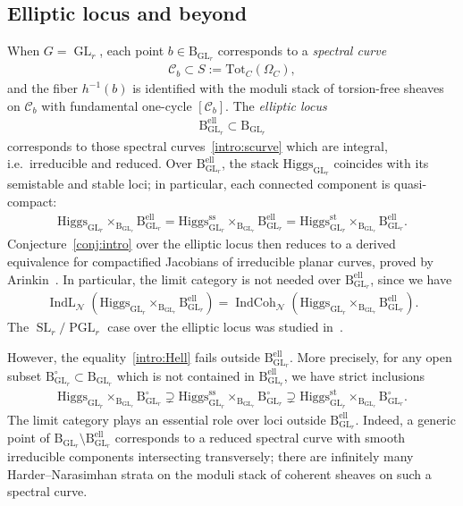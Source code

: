 \documentclass[11pt,oneside,a4paper,mathscr]{amsart}
\theoremstyle{definition}
\newcommand{\cC}{\mathcal{C}}
\newcommand{\rB}{\mathrm{B}}
\newcommand{\IndCoh}{\operatorname{IndCoh}}
\newcommand{\IndL}{\operatorname{IndL}}
\newcommand{\GL}{\operatorname{GL}}
\newcommand{\SL}{\operatorname{SL}}
\newcommand{\PGL}{\operatorname{PGL}}
\newcommand{\Hig}{\mathrm{Higgs}}
\begin{document}
\subsection{Elliptic locus and beyond}\label{subsec:introell}
When $G=\GL_r$, each point $b\in \rB_{\GL_r}$ corresponds to a 
\textit{spectral curve}
\begin{align}\label{intro:scurve}
    \cC_b \subset S:=\mathrm{Tot}_C(\Omega_C),
\end{align}
and the fiber $h^{-1}(b)$ is identified with the moduli stack of torsion-free sheaves on $\cC_b$ with fundamental one-cycle $[\cC_b]$. 
The \textit{elliptic locus} 
\begin{align*}
    \rB_{\GL_r}^{\mathrm{ell}} \subset \rB_{\GL_r}
\end{align*}
corresponds to those spectral curves~\eqref{intro:scurve} which are integral, i.e.\ irreducible and reduced. 
Over $\rB_{\GL_r}^{\mathrm{ell}}$, the stack $\Hig_{\GL_r}$ coincides with its semistable and stable loci; in particular, each connected component is quasi-compact:
\begin{align}\label{intro:Hell}
    \Hig_{\GL_r}\times_{\rB_{\GL_r}}\rB_{\GL_r}^{\mathrm{ell}}=
     \Hig_{\GL_r}^{\mathrm{ss}}\times_{\rB_{\GL_r}}\rB_{\GL_r}^{\mathrm{ell}}=
      \Hig_{\GL_r}^{\mathrm{st}}\times_{\rB_{\GL_r}}\rB_{\GL_r}^{\mathrm{ell}}.
\end{align}
Conjecture~\ref{conj:intro} over the elliptic locus then reduces to 
a derived equivalence for compactified Jacobians of irreducible 
planar curves, proved by Arinkin~\cite{Ardual}. In particular, the 
limit category is not needed over $\rB_{\GL_r}^{\mathrm{ell}}$, since 
we have 
\begin{align*}
    \IndL_{\mathcal{N}}(\Hig_{\GL_r}\times _{\rB_{\GL_r}}\rB_{\GL_r}^{\mathrm{ell}})
    =
    \IndCoh_{\mathcal{N}}(\Hig_{\GL_r}\times _{\rB_{\GL_r}}\rB_{\GL_r}^{\mathrm{ell}}).
\end{align*}
The $\SL_r/\PGL_r$ case over the elliptic locus was studied in~\cite[Theorem~4.7]{GS}.

However, the equality~\eqref{intro:Hell} fails outside $\rB_{\GL_r}^{\mathrm{ell}}$. 
More precisely, for any open subset $\rB_{\GL_r}^{\circ}\subset \rB_{\GL_r}$ which is not contained in 
$\rB_{\GL_r}^{\mathrm{ell}}$, we have strict inclusions
 \begin{align*}
       \Hig_{\GL_r}\times_{\rB_{\GL_r}}\rB_{\GL_r}^{\circ} \supsetneq
     \Hig_{\GL_r}^{\mathrm{ss}}\times_{\rB_{\GL_r}}\rB_{\GL_r}^{\circ} \supsetneq
      \Hig_{\GL_r}^{\mathrm{st}}\times_{\rB_{\GL_r}}\rB_{\GL_r}^{\circ}.
 \end{align*}
The limit category plays an essential role over loci outside $\rB_{\GL_r}^{\mathrm{ell}}$. 
Indeed, a generic point of $\rB_{\GL_r} \setminus \rB_{\GL_r}^{\mathrm{ell}}$ 
corresponds to a reduced spectral curve with smooth irreducible components intersecting transversely; there are infinitely many Harder--Narasimhan strata on the moduli stack of coherent sheaves on such a spectral curve. 
\end{document}
